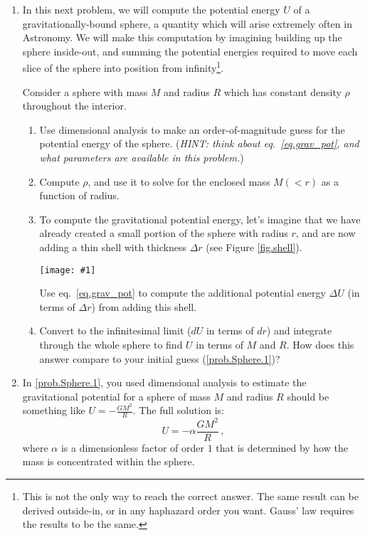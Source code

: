 \documentclass[11pt]{article}
\newcommand\plotoneman[2]{\centering \leavevmode
  \texttt{[image: \#1]}}
\begin{document}
\begin{enumerate}[resume]
\item
  \label{prob.Sphere}
  In this next problem, we will compute the potential energy $U$ of a
gravitationally-bound sphere, a quantity which will arise extremely
often in Astronomy. We will make this computation by imagining
building up the sphere inside-out, and summing the potential energies
required to move each slice of the sphere into position from
infinity\footnote{This is not the only way to reach the correct
  answer. The same result can be derived outside-in, or in any
  haphazard order you want. Gauss' law requires the results to be the same.}.

Consider a sphere with mass $M$ and radius $R$ which has constant
density $\rho$ throughout the interior.

\begin{enumerate}
\item
  \label{prob.Sphere.1}
  Use dimensional analysis to make an order-of-magnitude guess for the
  potential energy of the sphere. (\textit{HINT: think about
    eq.~\ref{eq.grav_pot}, and what parameters are available in this problem.})
\item
  \label{prob.Sphere.2}
  Compute $\rho$, and use it to solve for the enclosed mass $M(<r)$
  as a function of radius. 
\item
  \label{prob.Sphere.3}
  To compute the gravitational potential energy, let's imagine that we
  have already created a small portion of the sphere with radius $r$,
  and are now adding a thin shell with thickness $\Delta r$ (see
  Figure \ref{fig.shell}).

  \begin{figure*}[hbt]
    \plotoneman{sphere}{0.3}
    \caption{Figure for Problem \ref{prob.Sphere.3}.}
    \label{fig.shell}
  \end{figure*}

  Use eq.~\ref{eq.grav_pot} to compute the additional potential energy
  $\Delta U$ (in terms of $\Delta r$) from adding this shell.

\item
  \label{prob.Sphere.4}
  Convert to the infinitesimal limit ($dU$ in terms of $dr$) and
  integrate through the whole sphere to find $U$ in terms of $M$ and
  $R$. How does this answer compare to your initial guess (\ref{prob.Sphere.1})?
\end{enumerate}

\item
  \label{prob.limits}
In \ref{prob.Sphere.1}, you used dimensional analysis to estimate the
gravitational potential for a sphere of mass $M$ and radius $R$ should
be something like $U = - \frac{GM^2}{R}$. The full solution is:
\begin{equation}
  U = - \alpha \frac{GM^2}{R}\,,
\end{equation}
where $\alpha$ is a dimensionless factor of order $1$ that is
determined by how the mass is concentrated within the sphere.


\end{enumerate}
\end{document}

